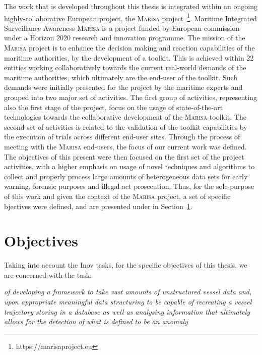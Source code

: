 The work that is developed throughout this thesis is integrated within an ongoing highly-collaborative European project, the \textsc{Marisa} project~\footnote{https://marisaproject.eu}. Maritime Integrated Surveillance Awareness \textsc{Marisa} is a project funded by European commission under a Horizon 2020 research and innovation programme. The mission of the \textsc{Marisa} project is to enhance the decision making and reaction capabilities of the maritime authorities, by the development of a toolkit. 
This is achieved within 22 entities working collaboratively towards the current real-world demands of the maritime authorities, which ultimately are the end-user of the toolkit. Such demands were initially presented for the project by the maritime experts and grouped into two major set of activities. The first group of activities, representing also the first stage of the project, focus on the usage of state-of-the-art technologies towards the collaborative development of the \textsc{Marisa} toolkit. The second set of activities is related to the validation of the toolkit capabilities by the execution of trials across different end-user sites.  
Through the process of meeting with the \textsc{Marisa} end-users, the focus of our current work was defined. The objectives of this present were then focused on the first set of the project activities, with a higher emphasis on usage of novel techniques and algorithms to collect and properly process large amounts of heterogeneous data sets for early warning, forensic purposes and illegal act prosecution. Thus, for the sole-purpose of this work and given the context of the \textsc{Marisa} project, a set of specific bjectives were defined, and are presented under in Section~\ref{section: thesis objectives}.

\section{Objectives}
\label{section: thesis objectives}
Taking into account the Inov tasks, for the specific objectives of this thesis, we are concerned with the task:

{\centering
\emph{
of developing a framework to take vast amounts of unstructured vessel data and, upon appropriate meaningful data structuring to be capable of recreating a vessel trajectory storing in a database as well as analysing information that ultimately allows for the detection of what is defined to be an anomaly}
}

